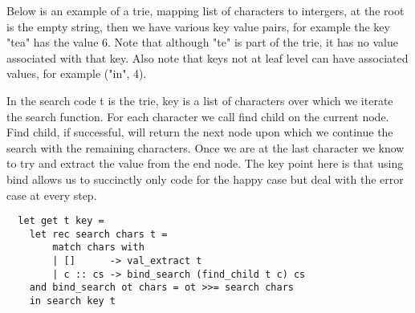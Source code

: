 Below is an example of a trie,
mapping list of characters to intergers,
at the root is the empty string,
then we have various key value pairs,
for example the key "tea" has the value 6.
Note that although "te" is part of the trie,
it has no value associated with that key.
Also note that keys not at leaf level can have associated
values, for example ("in", 4).
\begin{center}
\end{center}

In the search code t is the trie, key is a list of characters over which
we iterate the search function. For each character we call find child on
the current node. Find child, if successful, will return the next node
upon which we continue the search with the remaining characters. Once we
are at the last character we know to try and extract the value from the end
node. The key point here is that using bind allows us to succinctly only code
for the happy case but deal with the error case at every step.

\begin{verbatim}
  let get t key =
    let rec search chars t =
        match chars with
        | []      -> val_extract t
        | c :: cs -> bind_search (find_child t c) cs
    and bind_search ot chars = ot >>= search chars
    in search key t
\end{verbatim}

